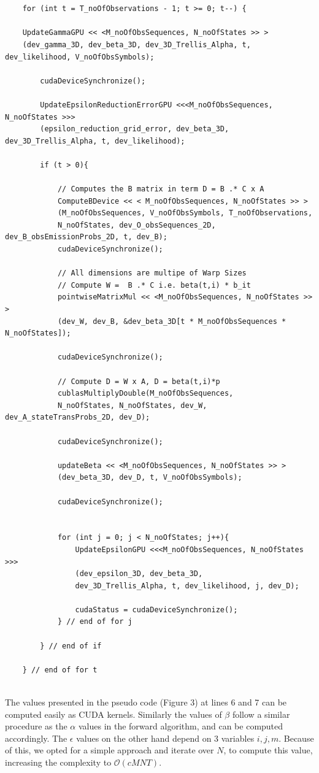\documentclass[english, paper=a4]{scrartcl}
\begin{document}
\begin{verbatim}
	

	for (int t = T_noOfObservations - 1; t >= 0; t--) {
	
	UpdateGammaGPU << <M_noOfObsSequences, N_noOfStates >> >
	(dev_gamma_3D, dev_beta_3D, dev_3D_Trellis_Alpha, t, dev_likelihood, V_noOfObsSymbols);

		cudaDeviceSynchronize();

		UpdateEpsilonReductionErrorGPU <<<M_noOfObsSequences, N_noOfStates >>>
		(epsilon_reduction_grid_error, dev_beta_3D, dev_3D_Trellis_Alpha, t, dev_likelihood);
		
		if (t > 0){

			// Computes the B matrix in term D = B .* C x A
			ComputeBDevice << < M_noOfObsSequences, N_noOfStates >> >
			(M_noOfObsSequences, V_noOfObsSymbols, T_noOfObservations, 
			N_noOfStates, dev_O_obsSequences_2D, dev_B_obsEmissionProbs_2D, t, dev_B);
			cudaDeviceSynchronize();

			// All dimensions are multipe of Warp Sizes
			// Compute W =  B .* C i.e. beta(t,i) * b_it
			pointwiseMatrixMul << <M_noOfObsSequences, N_noOfStates >> >
			(dev_W, dev_B, &dev_beta_3D[t * M_noOfObsSequences * N_noOfStates]);

			cudaDeviceSynchronize();

			// Compute D = W x A, D = beta(t,i)*p
			cublasMultiplyDouble(M_noOfObsSequences, 
			N_noOfStates, N_noOfStates, dev_W, dev_A_stateTransProbs_2D, dev_D);

			cudaDeviceSynchronize();

			updateBeta << <M_noOfObsSequences, N_noOfStates >> >
			(dev_beta_3D, dev_D, t, V_noOfObsSymbols);

			cudaDeviceSynchronize();


			for (int j = 0; j < N_noOfStates; j++){
				UpdateEpsilonGPU <<<M_noOfObsSequences, N_noOfStates >>>
				(dev_epsilon_3D, dev_beta_3D,
				dev_3D_Trellis_Alpha, t, dev_likelihood, j, dev_D);

				cudaStatus = cudaDeviceSynchronize();
			} // end of for j

		} // end of if
	
	} // end of for t
	
	\end{verbatim}
	
	The values presented in the pseudo code (Figure 3) at lines 6 and 7 can be computed easily as CUDA kernels. Similarly the values of \(\beta\) follow a similar procedure as the \(\alpha\) values in the forward algorithm, and can be computed accordingly. The \(\epsilon\) values on the other hand depend on 3 variables \(i,j,m\). Because of this, we opted for a simple approach and iterate over \(N\), to compute this value, increasing the complexity to $\mathcal{O}(cMNT)$.
	
\end{document}
